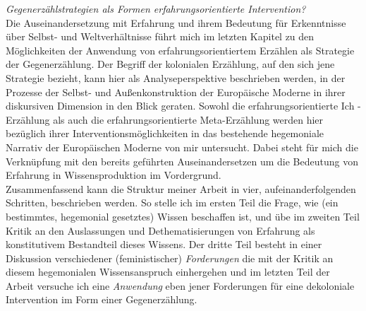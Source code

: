 \noindent\textit{Gegenerzählstrategien als Formen erfahrungsorientierte Intervention?}\\
Die Auseinandersetzung mit Erfahrung und ihrem Bedeutung für Erkenntnisse über
Selbst- und Weltverhältnisse führt mich im letzten Kapitel zu den Möglichkeiten
der Anwendung von erfahrungsorientiertem Erzählen als Strategie der
Gegenerzählung. Der Begriff der kolonialen Erzählung, auf den sich jene
Strategie bezieht, kann hier als Analyseperspektive beschrieben werden, in der
Prozesse der Selbst- und Außenkonstruktion der Europäische Moderne in ihrer
diskursiven Dimension in den Blick geraten. Sowohl die erfahrungsorientierte
Ich - Erzählung als auch die erfahrungsorientierte Meta-Erzählung werden hier
bezüglich ihrer Interventionsmöglichkeiten in das bestehende hegemoniale
Narrativ der Europäischen Moderne von mir untersucht. Dabei steht für mich die
Verknüpfung mit den bereits geführten Auseinandersetzen um die Bedeutung von
Erfahrung in Wissensproduktion im Vordergrund.\\

\noindent Zusammenfassend kann die Struktur meiner Arbeit in vier, aufeinanderfolgenden
Schritten, beschrieben werden. So stelle ich im ersten Teil die Frage, wie (ein
bestimmtes, hegemonial gesetztes) Wissen beschaffen ist, und übe im zweiten
Teil Kritik an den Auslassungen und Dethematisierungen von Erfahrung als
konstitutivem Bestandteil dieses Wissens. Der dritte Teil besteht in einer Diskussion verschiedener (feministischer)
\textit{Forderungen} die mit der Kritik an diesem hegemonialen Wissensanspruch
einhergehen und im letzten Teil der Arbeit versuche ich eine
\textit{Anwendung} eben
jener Forderungen für eine dekoloniale Intervention im Form einer
Gegenerzählung.

